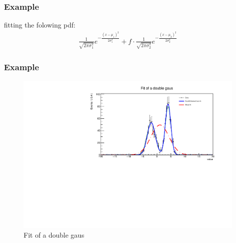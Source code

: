 \documentclass{beamer}
\begin{document}

\begin{frame}
 \frametitle{Example}
 fitting the folowing pdf:
 \begin{align}
  \frac{1}{\sqrt{2 \pi \sigma_1^2}} e^{- \frac{(x-\mu_1)^2}{2 \sigma_1^2}} + f \cdot  \frac{1}{\sqrt{2 \pi \sigma_2^2}} e^{- \frac{(x-\mu_2)^2}{2 \sigma_2^2}}
 \end{align}

\end{frame}

\begin{frame}
 \frametitle{Example}
 \begin{figure}
  \includegraphics[width=1.0\linewidth]{figures/twogausFit}
  \caption{Fit of a double gaus}
 \end{figure}
\end{frame}



\end{document}
